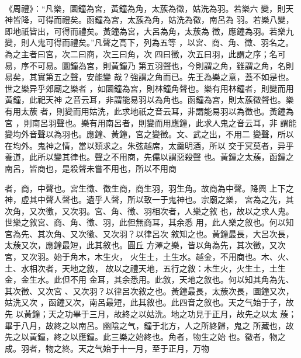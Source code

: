 \documentclass{ctexart}
\begin{document}
\paragraph{}
《周禮》：``凡樂，圜鐘為宮，黃鐘為角，太蔟為徵，姑洗為羽。若樂六 變，則天神皆降，可得而禮矣。函鐘為宮，太蔟為角，姑洗為徵，南呂為 羽。若樂八變，即地祇皆出，可得而禮矣。黃鐘為宮，大呂為角，太蔟為 徵，應鐘為羽。若樂九變，則人鬼可得而禮矣。''凡聲之高下，列為五等 ，以宮、商、角、徵、羽名之。為之主者曰宮，次二曰商，次三曰角，次 四曰徵，次五曰羽，此謂之序；名可易，序不可易。圜鐘為宮，則黃鐘乃 第五羽聲也，今則謂之角，雖謂之角，名則易矣，其實第五之聲，安能變 哉？強謂之角而已。先王為樂之意，蓋不如是也。世之樂异乎郊廟之樂者 ，如圜鐘為宮，則林鐘角聲也。樂有用林鐘者，則變而用黃鐘，此祀天神 之音云耳，非謂能易羽以為角也。函鐘為宮，則太蔟徵聲也。樂有用太蔟 者，則變而用姑洗，此求地祇之音云耳，非謂能易羽以為徵也。黃鐘為宮 ，則南呂羽聲也。樂有用南呂者，則變而用應鐘，此求人鬼之音云耳，非 謂能變均外音聲以為羽也。應鐘、黃鐘，宮之變徵。文、武之出，不用二 變聲，所以在均外。鬼神之情，當以類求之。朱弦越席，太羹明酒，所以 交于冥莫者，异乎養道，此所以變其律也。聲之不用商，先儒以謂惡殺聲 也。黃鐘之太蔟，函鐘之南呂，皆商也，是殺聲未嘗不用也，所以不用商

者，商，中聲也。宮生徵、徵生商，商生羽，羽生角。故商為中聲。降興 上下之神，虛其中聲人聲也。遺乎人聲，所以致一于鬼神也。宗廟之樂， 宮為之先，其次角，又次徵，又次羽。宮、角、徵、羽相次者，人樂之敘 也，故以之求人鬼。世樂之敘宮、商、角、徵、羽，此但無商耳，其余悉 用，此人樂之敘也。何以知宮為先、其次角、又次徵、又次羽？以律呂次 敘知之也。黃鐘最長，大呂次長，太蔟又次，應鐘最短，此其敘也。圓丘 方澤之樂，皆以角為先，其次徵，又次宮，又次羽。始于角木，木生火， 火生土，土生水。越金，不用商也。木、火、土、水相次者，天地之敘， 故以之禮天地，五行之敘：木生火，火生土，土生金，金生水。此但不用 金耳，其余悉用。此敘，天地之敘也。何以知其角為先、其次徵、又次宮 、又次羽？以律呂次敘之也。黃鐘最長，太蔟次長，圜鐘又次，姑洗又次 ，函鐘又次，南呂最短，此其敘也。此四音之敘也。天之气始于子，故先 以黃鐘；天之功畢于三月，故終之以姑洗。地之功見于正月，故先之以太 蔟；畢于八月，故終之以南呂。幽陰之气，鐘于北方，人之所終歸，鬼之 所藏也，故先之以黃鐘，終之以應鐘。此三樂之始終也。角者，物生之始 也。徵者，物之成。羽者，物之終。天之气始于十一月，至于正月，万物
\end{document}
